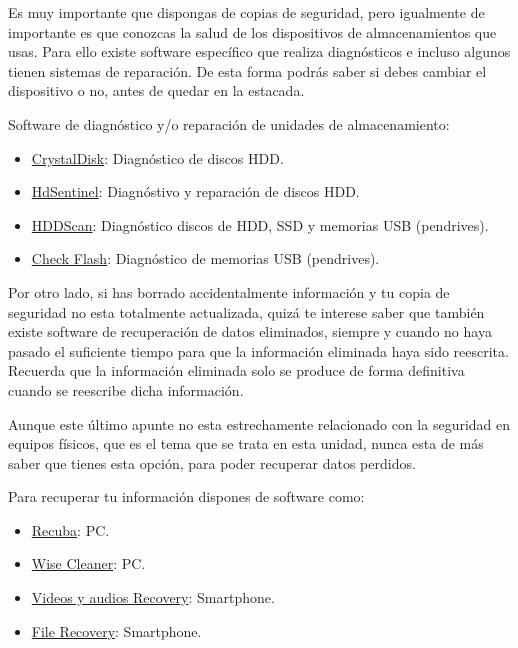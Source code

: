\documentclass[
  spanish,
  a4paper,
  openany]{book}
\begin{document}
Es muy importante que dispongas de copias de seguridad, pero igualmente de importante es que conozcas la salud de los dispositivos de almacenamientos que usas. Para ello existe software específico que realiza diagnósticos e incluso algunos tienen sistemas de reparación. De esta forma podrás saber si debes cambiar el dispositivo o no, antes de quedar en la estacada.

Software de diagnóstico y/o reparación de unidades de almacenamiento:

\begin{itemize}
\item
  \href{https://crystalmark.info/en/software/crystaldiskinfo/}{CrystalDisk}: Diagnóstico de discos HDD.
\item
  \href{https://www.hdsentinel.com/}{HdSentinel}: Diagnóstivo y reparación de discos HDD.
\item
  \href{https://hddscan.com/}{HDDScan}: Diagnóstico discos de HDD, SSD y memorias USB (pendrives).
\item
  \href{http://mikelab.kiev.ua/index_en.php?page=PROGRAMS/chkflsh_en}{Check Flash}: Diagnóstico de memorias USB (pendrives).
\end{itemize}

Por otro lado, si has borrado accidentalmente información y tu copia de seguridad no esta totalmente actualizada, quizá te interese saber que también existe software de recuperación de datos eliminados, siempre y cuando no haya pasado el suficiente tiempo para que la información eliminada haya sido reescrita. Recuerda que la información eliminada solo se produce de forma definitiva cuando se reescribe dicha información.

Aunque este último apunte no esta estrechamente relacionado con la seguridad en equipos físicos, que es el tema que se trata en esta unidad, nunca esta de más saber que tienes esta opción, para poder recuperar datos perdidos.

Para recuperar tu información dispones de software como:

\begin{itemize}
\item
  \href{https://www.ccleaner.com/recuva}{Recuba}: PC.
\item
  \href{https://www.wisecleaner.com/wise-data-recovery.html}{Wise Cleaner}: PC.
\item
  \href{https://play.google.com/store/apps/details?id=com.mediarecovery.deletedvideorecovery.deletedaudiorecovery\&hl=es}{Videos y audios Recovery}: Smartphone.
\item
  \href{https://play.google.com/store/apps/details?id=com.file.recovery.data.recovery.deletedfilerecovery}{File Recovery}: Smartphone.
\end{itemize}
\end{document}
